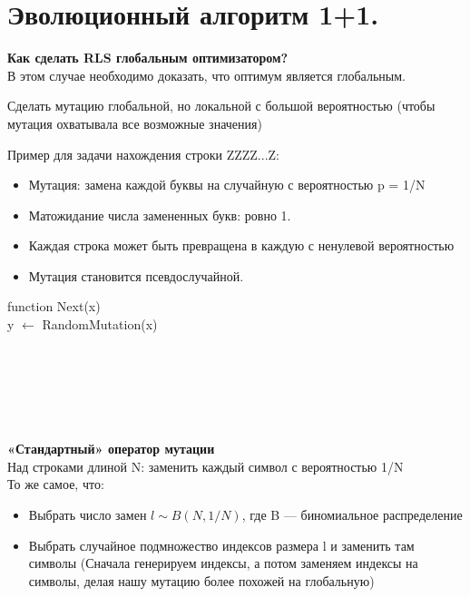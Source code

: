 \newcommand\tab[1][1cm]{\hspace*{#1}}
\section{Эволюционный алгоритм 1+1.}

\textbf{Как сделать RLS глобальным оптимизатором?}\\
В этом случае необходимо доказать, что оптимум является глобальным.

Сделать мутацию глобальной, но локальной с большой вероятностью (чтобы мутация охватывала все возможные значения)

Пример для задачи нахождения строки ZZZZ...Z:
\begin{itemize}
    \item Мутация: замена каждой буквы на случайную с вероятностью p = 1/N
    \item Матожидание числа замененных букв: ровно 1.
    \item Каждая строка может быть превращена в каждую с ненулевой вероятностью
    \item Мутация становится псевдослучайной.
\end{itemize}

function Next(x)  \\
y $\leftarrow$ RandomMutation(x)  \\
\tab {if f (y) $\ge$ f (x) then} \\ 
\tab \tab {} \\
\tab {} \\
\tab {}  \\
 \\
\\
\textbf{«Стандартный» оператор мутации}\\
Над строками длиной N: заменить каждый символ с вероятностью 1/N \\

То же самое, что:
\begin{itemize}
    \item Выбрать число замен $l \sim B(N,1/N)$, где B — биномиальное распределение  
    \item Выбрать случайное подмножество индексов размера l и заменить там символы
    (Сначала генерируем индексы, а потом заменяем индексы на символы, делая нашу
    мутацию более похожей на глобальную)
\end{itemize}

